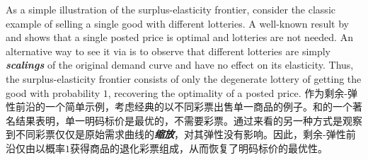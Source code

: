 \documentclass[12pt,letterpaper]{article}
\newenvironment{original}{\color{black}\noindent}{}
\newenvironment{translation}{\color{blue}\noindent}{}
\theoremstyle{plain}
\theoremstyle{definition}
\theoremstyle{remark}
\renewcommand{\1}{\mathds{1}}
\theoremstyle{definition}
\begin{document}
\begin{original}
As a simple illustration of the surplus-elasticity frontier, consider the classic example of selling a single good with different lotteries. A well-known result by \citet{Myerson1981} and \citet{riley1983optimal} shows that a single posted price is optimal and lotteries are not needed. An alternative way to see it via  is to observe that different lotteries are simply \textit{\textbf{scalings}} of the original demand curve and have no effect on its elasticity. Thus, the surplus-elasticity frontier consists of only the degenerate lottery of getting the good with probability $1$, recovering the optimality of a posted price.
\end{original}
\begin{translation}
作为剩余-弹性前沿的一个简单示例，考虑经典的以不同彩票出售单一商品的例子。\citet{Myerson1981}和\citet{riley1983optimal}的一个著名结果表明，单一明码标价是最优的，不需要彩票。通过来看的另一种方式是观察到不同彩票仅仅是原始需求曲线的\textit{\textbf{缩放}}，对其弹性没有影响。因此，剩余-弹性前沿仅由以概率$1$获得商品的退化彩票组成，从而恢复了明码标价的最优性。
\end{translation}
\end{document}
